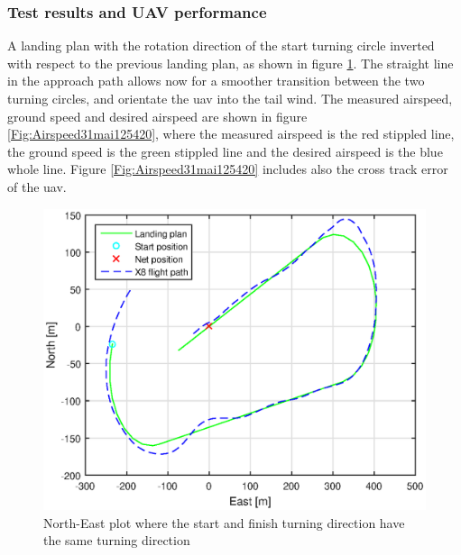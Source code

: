 \subsubsection{Test results and UAV performance}
A landing plan with the rotation direction of the start turning circle inverted with respect to the previous landing plan, as shown in figure \ref{Fig:NorthEast31mai125420}. The straight line in the approach path allows now for a smoother transition between the two turning circles, and orientate the \gls{uav} into the tail wind. The measured airspeed, ground speed and desired airspeed are shown in figure \ref{Fig:Airspeed31mai125420}, where the measured airspeed is the red stippled line, the ground speed is the green stippled line and the desired airspeed is the blue whole line. Figure \ref{Fig:Airspeed31mai125420} includes also the cross track error of the \gls{uav}.
\begin{figure}[H]
	\centering
	\includegraphics[scale=0.7]{figs/Experiment/NorthEast31mai125420.eps}
	\caption{North-East plot where the start and finish turning direction have the same turning direction}
	\label{Fig:NorthEast31mai125420}
\end{figure}
